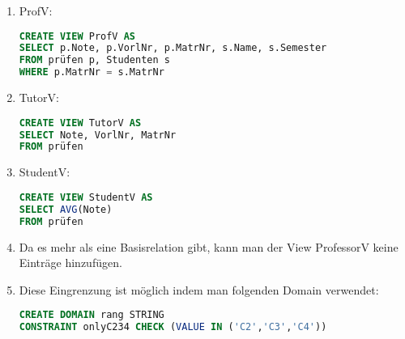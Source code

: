 \documentclass{scrartcl}
\begin{document}
\begin{enumerate}
    \item ProfV:
\begin{lstlisting}[language=sql]
CREATE VIEW ProfV AS 
SELECT p.Note, p.VorlNr, p.MatrNr, s.Name, s.Semester
FROM prüfen p, Studenten s 
WHERE p.MatrNr = s.MatrNr 
\end{lstlisting}
    \item TutorV:
\begin{lstlisting}[language=sql]
CREATE VIEW TutorV AS 
SELECT Note, VorlNr, MatrNr
FROM prüfen
\end{lstlisting}
    \item StudentV:
\begin{lstlisting}[language=sql]
CREATE VIEW StudentV AS 
SELECT AVG(Note)
FROM prüfen
\end{lstlisting}
    \item Da es mehr als eine Basisrelation gibt, kann man der View ProfessorV keine Einträge hinzufügen.
    \item Diese Eingrenzung ist möglich indem man folgenden Domain verwendet:
\begin{lstlisting}[language=sql]
CREATE DOMAIN rang STRING
CONSTRAINT onlyC234 CHECK (VALUE IN ('C2','C3','C4'))
\end{lstlisting}
\end{enumerate}
\end{document}
